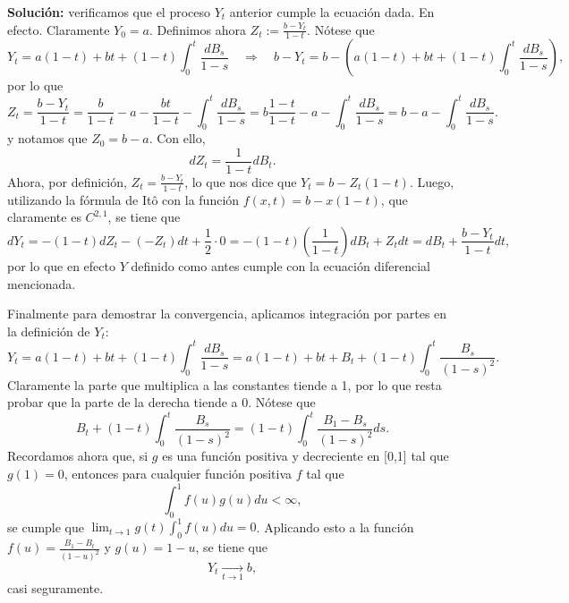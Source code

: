 \documentclass[letterpaper]{article}
\renewcommand{\to}{\rightarrow}
\newcommand{\ent}{\Longrightarrow}
\newcommand{\1}{\mathds{1}}
\theoremstyle{definition}
\theoremstyle{definition}
\theoremstyle{definition}
\theoremstyle{definition}
\theoremstyle{definition}
\begin{document}
\begin{enumerate}
    \textbf{Solución:} verificamos que el proceso $Y_t$ anterior cumple la ecuación dada. En efecto. Claramente $Y_0=a$. Definimos ahora 
    $Z_t:=\frac{b-Y_t}{1-t}$. Nótese que 
    \[
    Y_t=    a(1-t) + bt + (1-t)\int_{0}^{t}\frac{dB_s}{1-s} \quad \ent \quad b-Y_t=b-\left(a(1-t) + bt + (1-t)\int_{0}^{t}\frac{dB_s}{1-s}\right),
    \]
    por lo que 
    \[
    Z_t=\frac{b-Y_t}{1-t}=\frac{b}{1-t}-a-\frac{bt}{1-t}-\int_{0}^{t}\frac{dB_s}{1-s}=b\frac{1-t}{1-t}-a-\int_{0}^{t}\frac{dB_s}{1-s}=b-a-\int_0^t\frac{dB_s}{1-s}.    
    \]
    y notamos que $Z_0=b-a$. Con ello, 
    \[
      dZ_t=\frac{1}{1-t}dB_t.
    \]
    Ahora, por definición, $Z_t=\frac{b-Y_t}{1-t}$, lo que nos dice que $Y_t=b-Z_t(1-t)$. Luego, utilizando 
    la fórmula de Itô con la función $f(x,t)=b-x(1-t)$, que claramente es $C^{2,1}$, se tiene que 
    \[
    dY_t=-(1-t)dZ_t-(-Z_t)dt+\frac{1}{2}\cdot 0=-(1-t)(\frac{1}{1-t})dB_t+Z_tdt=dB_t+\frac{b-Y_t}{1-t}dt,    
    \]
    por lo que en efecto $Y$ definido como antes cumple con la ecuación diferencial mencionada.
    \newline

    Finalmente para demostrar la convergencia, aplicamos integración por partes en la definición de  $Y_t$:
    \[
    Y_t= a(1-t) + bt + (1-t)\int_{0}^{t}\frac{dB_s}{1-s} =  a(1-t) + bt + B_t+(1-t)\int_{0}^{t}\frac{B_s}{(1-s)^2}.
    \]
    Claramente la parte que multiplica a las constantes tiende a 1, por lo que resta probar que la parte de la derecha tiende a 0. Nótese que 
    \[
    B_t+ (1-t)\int_{0}^{t}\frac{B_s}{(1-s)^2}=(1-t)\int_{0}^{t}\frac{B_1-B_s}{(1-s)^2}ds.
    \]
    Recordamos ahora que, si $g$ es una función positiva y decreciente en [0,1] tal que $g(1)=0$, entonces 
    para cualquier función positiva $f$ tal que 
    \[
    \int_0^{1}f(u)g(u)du <\infty,   
    \]
    se cumple que $\lim_{t\to 1}g(t)\int_{0}^{1}f(u)du=0$. Aplicando esto a la función $f(u)=\frac{B_1-B_t}{(1-u)^2}$
    y $g(u)=1-u$, se tiene que 
    \[
        Y_t\xrightarrow[t\to1]{}b,
    \]
    casi seguramente.

    
\end{enumerate}
\end{document}
